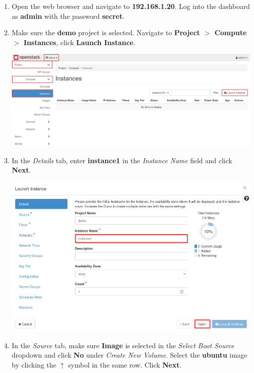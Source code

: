 \documentclass[letterpaper, 12pt]{article}
\begin{document}
\begin{enumerate}
    \item Open the web browser and navigate to \textbf{192.168.1.20}. Log into the dashboard as \textbf{admin} with the
    password \textbf{secret}.

    \item Make sure the \textbf{demo} project is selected. Navigate to \textbf{Project $>$ Compute $>$ Instances}, 
    click \textbf{Launch Instance}.

    \begin{center}
        \includegraphics[width=\linewidth]{images/part2/step2.png}
    \end{center}

    \item In the \textit{Details} tab, enter \textbf{instance1} in the \textit{Instance Name} field and click
    \textbf{Next}.

    \begin{center}
        \includegraphics[width=\linewidth]{images/part2/step3.png}
    \end{center}

    \item In the \textit{Source} tab, make sure \textbf{Image} is selected in the \textit{Select Boot Source} dropdown
    and click \textbf{No} under \textit{Create New Volume}. Select the \textbf{ubuntu} image by clicking the $\uparrow$
    symbol in the same row. Click \textbf{Next}.


\end{enumerate}
\end{document}
